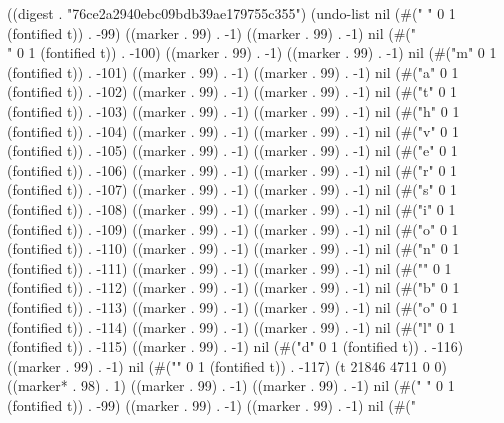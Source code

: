 
((digest . "76ce2a2940ebc09bdb39ae179755c355") (undo-list nil (#("
" 0 1 (fontified t)) . -99) ((marker . 99) . -1) ((marker . 99) . -1) nil (#("\\" 0 1 (fontified t)) . -100) ((marker . 99) . -1) ((marker . 99) . -1) nil (#("m" 0 1 (fontified t)) . -101) ((marker . 99) . -1) ((marker . 99) . -1) nil (#("a" 0 1 (fontified t)) . -102) ((marker . 99) . -1) ((marker . 99) . -1) nil (#("t" 0 1 (fontified t)) . -103) ((marker . 99) . -1) ((marker . 99) . -1) nil (#("h" 0 1 (fontified t)) . -104) ((marker . 99) . -1) ((marker . 99) . -1) nil (#("v" 0 1 (fontified t)) . -105) ((marker . 99) . -1) ((marker . 99) . -1) nil (#("e" 0 1 (fontified t)) . -106) ((marker . 99) . -1) ((marker . 99) . -1) nil (#("r" 0 1 (fontified t)) . -107) ((marker . 99) . -1) ((marker . 99) . -1) nil (#("s" 0 1 (fontified t)) . -108) ((marker . 99) . -1) ((marker . 99) . -1) nil (#("i" 0 1 (fontified t)) . -109) ((marker . 99) . -1) ((marker . 99) . -1) nil (#("o" 0 1 (fontified t)) . -110) ((marker . 99) . -1) ((marker . 99) . -1) nil (#("n" 0 1 (fontified t)) . -111) ((marker . 99) . -1) ((marker . 99) . -1) nil (#("{" 0 1 (fontified t)) . -112) ((marker . 99) . -1) ((marker . 99) . -1) nil (#("b" 0 1 (fontified t)) . -113) ((marker . 99) . -1) ((marker . 99) . -1) nil (#("o" 0 1 (fontified t)) . -114) ((marker . 99) . -1) ((marker . 99) . -1) nil (#("l" 0 1 (fontified t)) . -115) ((marker . 99) . -1) nil (#("d" 0 1 (fontified t)) . -116) ((marker . 99) . -1) nil (#("}" 0 1 (fontified t)) . -117) (t 21846 4711 0 0) ((marker* . 98) . 1) ((marker . 99) . -1) ((marker . 99) . -1) nil (#("
" 0 1 (fontified t)) . -99) ((marker . 99) . -1) ((marker . 99) . -1) nil (#("%
